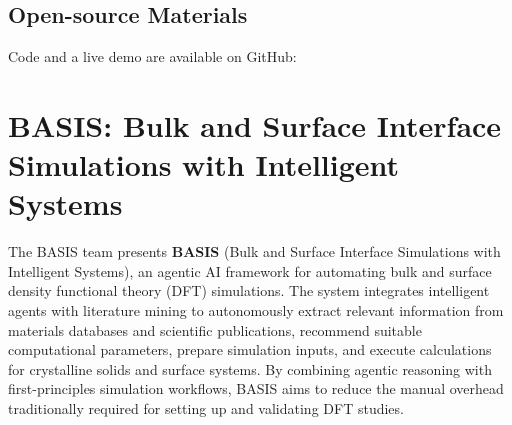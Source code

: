 \subsection*{Open-source Materials}
Code and a live demo are available on GitHub: 








\section{BASIS: Bulk and Surface Interface Simulations with Intelligent Systems}

%

The BASIS team presents \textbf{BASIS} (Bulk and Surface Interface Simulations with Intelligent Systems), an agentic AI framework for automating bulk and surface density functional theory (DFT) simulations. The system integrates intelligent agents with literature mining to autonomously extract relevant information from materials databases and scientific publications, recommend suitable computational parameters, prepare simulation inputs, and execute calculations for crystalline solids and surface systems. By combining agentic reasoning with first-principles simulation workflows, BASIS aims to reduce the manual overhead traditionally required for setting up and validating DFT studies.

